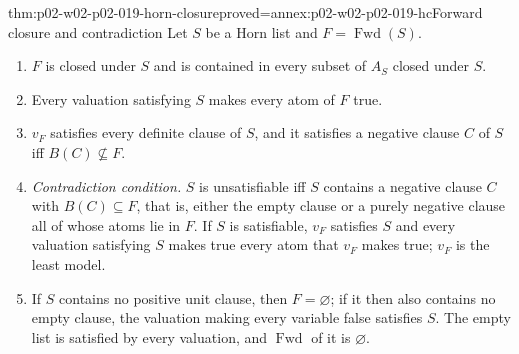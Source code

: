 \begin{hbtheorem}{thm:p02-w02-p02-019-horn-closure}{proved=annex:p02-w02-p02-019-hc}{Forward closure and contradiction}
Let \(S\) be a Horn list and \(F=\operatorname{Fwd}(S)\).
\begin{enumerate}
  \item \(F\) is closed under \(S\) and is contained in every subset of
        \(A_S\) closed under \(S\).
  \item Every valuation satisfying \(S\) makes every atom of \(F\) true.
  \item \(v_F\) satisfies every definite clause of \(S\), and it satisfies a
        negative clause \(C\) of \(S\) iff \(B(C)\not\subseteq F\).
  \item \emph{Contradiction condition.}  \(S\) is unsatisfiable iff \(S\)
        contains a negative clause \(C\) with \(B(C)\subseteq F\), that is,
        either the empty clause or a purely negative clause all of whose
        atoms lie in \(F\).  If \(S\) is satisfiable, \(v_F\) satisfies \(S\)
        and every valuation satisfying \(S\) makes true every atom that
        \(v_F\) makes true; \(v_F\) is the least model.
  \item If \(S\) contains no positive unit clause, then \(F=\varnothing\);
        if it then also contains no empty clause, the valuation making every
        variable false satisfies \(S\).  The empty list is satisfied by every
        valuation, and \(\operatorname{Fwd}\) of it is \(\varnothing\).
\end{enumerate}
\end{hbtheorem}

